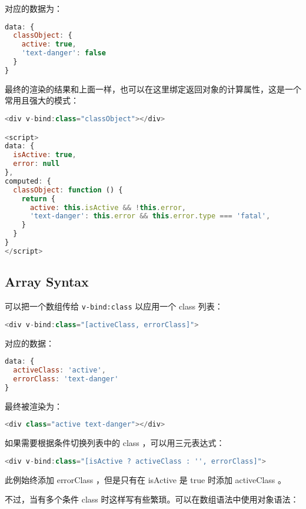 对应的数据为：

\begin{lstlisting}[language=JavaScript]
data: {
  classObject: {
    active: true,
    'text-danger': false
  }
}
\end{lstlisting}

最终的渲染的结果和上面一样，也可以在这里绑定返回对象的计算属性，这是一个常用且强大的模式：

\begin{lstlisting}[language=JavaScript]
<div v-bind:class="classObject"></div>

<script>
data: {
  isActive: true,
  error: null
},
computed: {
  classObject: function () {
    return {
      active: this.isActive && !this.error,
      'text-danger': this.error && this.error.type === 'fatal',
    }
  }
}
</script>
\end{lstlisting}


\subsection{Array Syntax}

可以把一个数组传给 \texttt{v-bind:class} 以应用一个 class 列表：


\begin{lstlisting}[language=JavaScript]
<div v-bind:class="[activeClass, errorClass]">
\end{lstlisting}

对应的数据：

\begin{lstlisting}[language=JavaScript]
data: {
  activeClass: 'active',
  errorClass: 'text-danger'
}
\end{lstlisting}

最终被渲染为：

\begin{lstlisting}[language=JavaScript]
<div class="active text-danger"></div>
\end{lstlisting}

如果需要根据条件切换列表中的 class ，可以用三元表达式：


\begin{lstlisting}[language=JavaScript]
<div v-bind:class="[isActive ? activeClass : '', errorClass]">
\end{lstlisting}

此例始终添加 errorClass ，但是只有在 isActive 是 true 时添加 activeClass 。

不过，当有多个条件 class 时这样写有些繁琐。可以在数组语法中使用对象语法：

